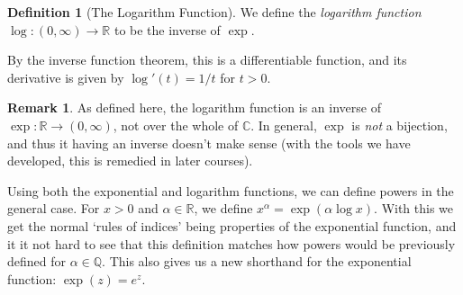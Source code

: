 \documentclass[11pt, a4paper]{article}
\theoremstyle{definition}
\newtheorem{definition}[theorem]{Definition}
\newtheorem*{remark}{Remark}
\newcommand{\vocab}[1]{\emph{#1}} %
\newcommand{\C}{\mathbb{C}}
\newcommand{\Q}{\mathbb{Q}}
\newcommand{\R}{\mathbb{R}}
\begin{document}
\begin{definition}[The Logarithm Function]
	We define the \vocab{logarithm function} $\log : (0, \infty) \rightarrow \R$ to be the inverse of $\exp$.
\end{definition}

By the inverse function theorem, this is a differentiable function, and its derivative is given by $\log'(t) = 1/t$ for $t > 0$.

\begin{remark}As defined here, the logarithm function is an inverse of $\exp: \R \rightarrow (0, \infty)$, not over the whole of $\C$. In general, $\exp$ is \emph{not} a bijection, and thus it having an inverse doesn't make sense (with the tools we have developed, this is remedied in later courses).
\end{remark}

Using both the exponential and logarithm functions, we can define powers in the general case. For $x > 0$ and $\alpha \in \R$, we define $x^\alpha = \exp(\alpha \log x)$. With this we get the normal `rules of indices' being properties of the exponential function, and it it not hard to see that this definition matches how powers would be previously defined for $\alpha \in \Q$. This also gives us a new shorthand for the exponential function: $\exp(z) = e^z$.
\end{document}
